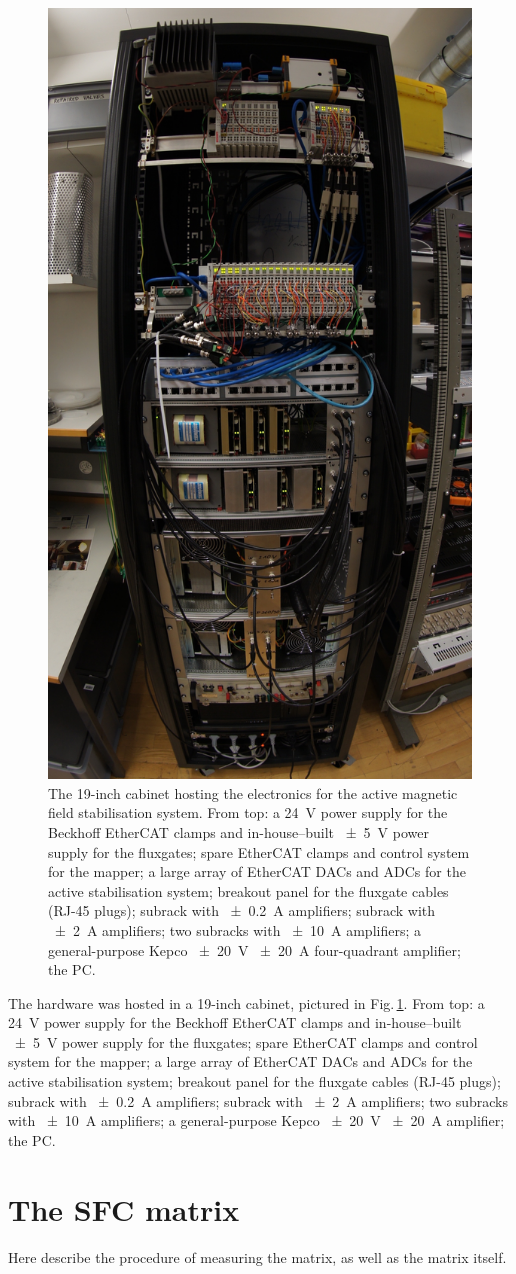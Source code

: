 \begin{figure}
  \centering
  \includegraphics[width=0.4\linewidth]{gfx/prototype/DSC03477_cropped.jpeg}
  \caption{The 19-inch cabinet hosting the electronics for the active magnetic field stabilisation system. From top: a \SI{24}{V} power supply for the Beckhoff EtherCAT clamps and in-house--built \SI{\pm 5}{\volt} power supply for the fluxgates; spare EtherCAT clamps and control system for the mapper; a large array of EtherCAT DACs and ADCs for the active stabilisation system; breakout panel for the fluxgate cables (RJ-45 plugs); subrack with \SI{\pm 0.2}{A} amplifiers; subrack with \SI{\pm 2}{A} amplifiers; two subracks with \SI{\pm 10}{A} amplifiers; a general-purpose Kepco \SI{\pm 20}{V} \SI{\pm 20}{A} four-quadrant amplifier; the PC.}
  \label{fig:prototype_photo_daq}
\end{figure}

The hardware was hosted in a 19-inch cabinet, pictured in Fig.\,\ref{fig:prototype_photo_daq}. From top: a \SI{24}{V} power supply for the Beckhoff EtherCAT clamps and in-house--built \SI{\pm 5}{\volt} power supply for the fluxgates; spare EtherCAT clamps and control system for the mapper; a large array of EtherCAT DACs and ADCs for the active stabilisation system; breakout panel for the fluxgate cables (RJ-45 plugs); subrack with \SI{\pm 0.2}{A} amplifiers; subrack with \SI{\pm 2}{A} amplifiers; two subracks with \SI{\pm 10}{A} amplifiers; a general-purpose Kepco \SI{\pm 20}{V} \SI{\pm 20}{A} amplifier; the PC.



\section{The SFC matrix}
Here describe the procedure of measuring the matrix, as well as the matrix itself.

